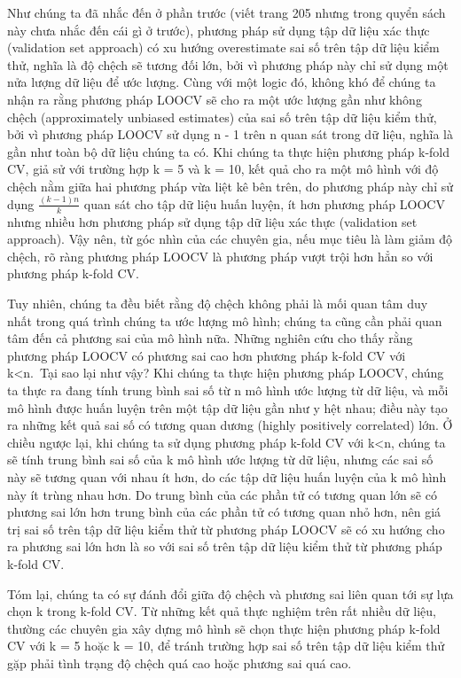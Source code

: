 \documentclass[
]{article}
\begin{document}
Như chúng ta đã nhắc đến ở phần trước (viết trang 205 nhưng trong quyển sách này chưa nhắc đến cái gì ở trước), phương pháp sử dụng tập dữ liệu xác thực (validation set approach) có xu hướng overestimate sai số trên tập dữ liệu kiểm thử, nghĩa là độ chệch sẽ tương đối lớn, bởi vì phương pháp này chỉ sử dụng một nửa lượng dữ liệu để ước lượng. Cùng với một logic đó, không khó để chúng ta nhận ra rằng phương pháp LOOCV sẽ cho ra một ước lượng gần như không chệch (approximately unbiased estimates) của sai số trên tập dữ liệu kiểm thử, bởi vì phương pháp LOOCV sử dụng n - 1 trên n quan sát trong dữ liệu, nghĩa là gần như toàn bộ dữ liệu chúng ta có. Khi chúng ta thực hiện phương pháp k-fold CV, giả sử với trường hợp k = 5 và k = 10, kết quả cho ra một mô hình với độ chệch nằm giữa hai phương pháp vừa liệt kê bên trên, do phương pháp này chỉ sử dụng \(\frac{(k-1)n}{k}\) quan sát cho tập dữ liệu huấn luyện, ít hơn phương pháp LOOCV nhưng nhiều hơn phương pháp sử dụng tập dữ liệu xác thực (validation set approach). Vậy nên, từ góc nhìn của các chuyên gia, nếu mục tiêu là làm giảm độ chệch, rõ ràng phương pháp LOOCV là phương pháp vượt trội hơn hẳn so với phương pháp k-fold CV.

Tuy nhiên, chúng ta đều biết rằng độ chệch không phải là mối quan tâm duy nhất trong quá trình chúng ta ước lượng mô hình; chúng ta cũng cần phải quan tâm đến cả phương sai của mô hình nữa. Những nghiên cứu cho thấy rằng phương pháp LOOCV có phương sai cao hơn phương pháp k-fold CV với k\textless n.~Tại sao lại như vậy? Khi chúng ta thực hiện phương pháp LOOCV, chúng ta thực ra đang tính trung bình sai số từ n mô hình ước lượng từ dữ liệu, và mỗi mô hình được huấn luyện trên một tập dữ liệu gần như y hệt nhau; điều này tạo ra những kết quả sai số có tương quan dương (highly positively correlated) lớn. Ở chiều ngược lại, khi chúng ta sử dụng phương pháp k-fold CV với k\textless n, chúng ta sẽ tính trung bình sai số của k mô hình ước lượng từ dữ liệu, nhưng các sai số này sẽ tương quan với nhau ít hơn, do các tập dữ liệu huấn luyện của k mô hình này ít trùng nhau hơn. Do trung bình của các phần tử có tương quan lớn sẽ có phương sai lớn hơn trung bình của các phần tử có tương quan nhỏ hơn, nên giá trị sai số trên tập dữ liệu kiểm thử từ phương pháp LOOCV sẽ có xu hướng cho ra phương sai lớn hơn là so với sai số trên tập dữ liệu kiểm thử từ phương pháp k-fold CV.

Tóm lại, chúng ta có sự đánh đổi giữa độ chệch và phương sai liên quan tới sự lựa chọn k trong k-fold CV. Từ những kết quả thực nghiệm trên rất nhiều dữ liệu, thường các chuyên gia xây dựng mô hình sẽ chọn thực hiện phương pháp k-fold CV với k = 5 hoặc k = 10, để tránh trường hợp sai số trên tập dữ liệu kiểm thử gặp phải tình trạng độ chệch quá cao hoặc phương sai quá cao.
\end{document}
